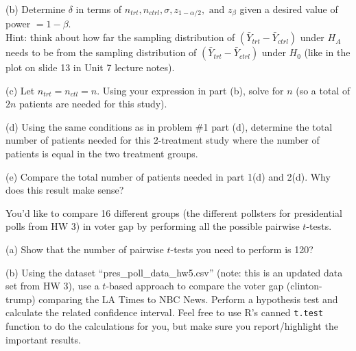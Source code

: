 \documentclass[11pt]{article}
\begin{document}
\vspace{0.1in}

\noindent (b) Determine $\delta$ in terms of $n_{trt}, n_{ctrl}, \sigma, z_{1-\alpha/2}, \text{ and } z_{\beta}$ given a desired value of power $= 1-\beta$. \\
Hint: think about how far the sampling distribution of $(\bar{Y}_{trt} - \bar{Y}_{ctrl})$ under $H_A$ needs to be from the sampling distribution of $(\bar{Y}_{trt} - \bar{Y}_{ctrl})$ under $H_0$ (like in the plot on slide 13 in Unit 7 lecture notes).

\vspace{0.1in}

\noindent (c) Let $n_{trt} = n_{ctl} = n$.  Using your expression in part (b), solve for $n$ (so a total of $2n$ patients are needed for this study).

\vspace{0.1in}

\noindent (d) Using the same conditions as in problem \#1 part (d), determine the total number of patients needed for this 2-treatment study where the number of patients is equal in the two treatment groups.  

\vspace{0.1in}

\noindent (e) Compare the total number of patients needed in part 1(d) and 2(d).  Why does this result make sense?



\vspace{0.3in}



 You'd like to compare 16 different groups (the different pollsters for presidential polls from HW 3) in voter gap by performing all the possible pairwise $t$-tests.  

\vspace{0.1in}

\noindent (a) Show that the number of pairwise $t$-tests you need to perform is 120?

\vspace{0.1in}

\noindent (b) Using the dataset ``pres\_poll\_data\_hw5.csv'' (note: this is an updated data set from HW 3), use a $t$-based approach to compare the voter gap (clinton-trump) comparing the LA Times to NBC News.  Perform a hypothesis test and calculate the related confidence interval.  Feel free to use R's canned \texttt{t.test} function to do the calculations for you, but make sure you report/highlight the important results.
\end{document}
